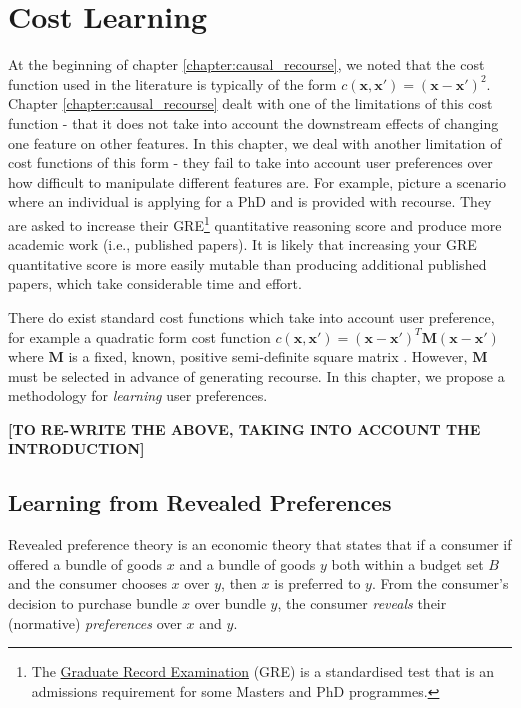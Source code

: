 \chapter{Cost Learning} \label{chapter:cost_learning}

At the beginning of chapter \ref{chapter:causal_recourse}, we noted that the cost function used in the literature is typically of the form $c(\mathbf{x}, \mathbf{x}') = (\mathbf{x} - \mathbf{x}')^2$. Chapter \ref{chapter:causal_recourse} dealt with one of the limitations of this cost function - that it does not take into account the downstream effects of changing one feature on other features. In this chapter, we deal with another limitation of cost functions of this form - they fail to take into account user preferences over how difficult to manipulate different features are. For example, picture a scenario where an individual is applying for a PhD and is provided with recourse. They are asked to increase their GRE\footnote{The \href{https://www.ets.org/gre.html}{Graduate Record Examination} (GRE) is a standardised test that is an admissions requirement for some Masters and PhD programmes.} quantitative reasoning score and produce more academic work (i.e., published papers). It is likely that increasing your GRE quantitative score is more easily mutable than producing additional published papers, which take considerable time and effort.

There do exist standard cost functions which take into account user preference, for example a quadratic form cost function $c(\mathbf{x}, \mathbf{x}') = (\mathbf{x-x'})^T\mathbf{M}(\mathbf{x-x'})$ where $\mathbf{M}$ is a fixed, known, positive semi-definite square matrix \citep{bechavodInformationDiscrepancyStrategic2022}. However, $\mathbf{M}$ must be selected in advance of generating recourse. In this chapter, we propose a methodology for \textit{learning} user preferences.

\textbf{[TO RE-WRITE THE ABOVE, TAKING INTO ACCOUNT THE INTRODUCTION]}


\section{Learning from Revealed Preferences}

Revealed preference theory \citep{samuelsonNotePureTheory1938, samuelsonConsumptionTheoryTerms1948} is an economic theory that states that if a consumer if offered a bundle of goods $x$ and a bundle of goods $y$ both within a budget set $B$ and the consumer chooses $x$ over $y$, then $x$ is preferred to $y$. From the consumer's decision to purchase bundle $x$ over bundle $y$, the consumer \textit{reveals} their (normative) \textit{preferences} over $x$ and $y$.

